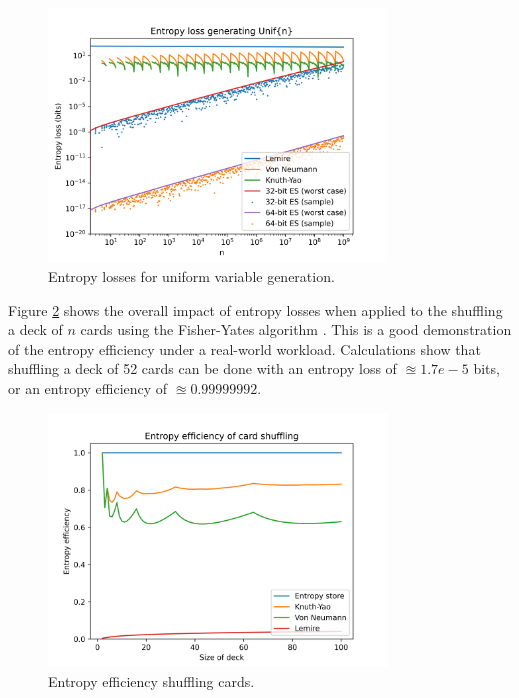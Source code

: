 \documentclass[12pt]{article}
\begin{document}
\begin{figure}[ht]
\centering
\includegraphics[width=0.8\textwidth]{uniform_losses.png}
\caption{Entropy losses for uniform variable generation.}
\label{fig:uniform-losses}
\end{figure}

Figure \ref{fig:shuffling-efficiency} shows the overall impact of entropy losses when applied to the shuffling a deck of $n$ cards using the Fisher-Yates algorithm \cite{fisher1953statistical, durstenfeld1964algorithm, knuth2014art}. This is a good demonstration of the entropy efficiency under a real-world workload. Calculations show that shuffling a deck of 52 cards can be done with an entropy loss of $\approxeq 1.7e-5$ bits, or an entropy efficiency of $\approxeq 0.99999992$.

\begin{figure}[ht]
\centering
\includegraphics[width=0.8\textwidth]{shuffling_efficiency.png}
\caption{Entropy efficiency shuffling cards.}
\label{fig:shuffling-efficiency}
\end{figure}
\end{document}
